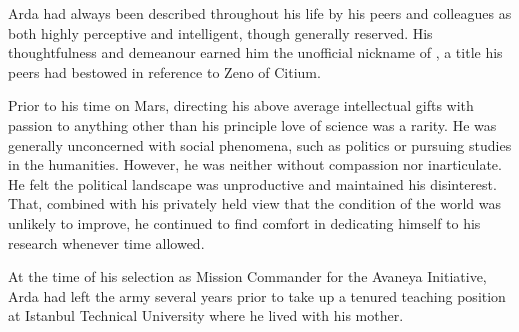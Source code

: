 Arda had always been described throughout his life by his peers and colleagues as both highly perceptive and intelligent, though generally reserved. His thoughtfulness and demeanour earned him the unofficial nickname of , a title his peers had bestowed in reference to Zeno of Citium.

Prior to his time on Mars, directing his above average intellectual gifts with passion to anything other than his principle love of science was a rarity. He was generally unconcerned with social phenomena, such as politics or pursuing studies in the humanities. However, he was neither without compassion nor inarticulate. He felt the political landscape was unproductive and maintained his disinterest. That, combined with his privately held view that the condition of the world was unlikely to improve, he continued to find comfort in dedicating himself to his research whenever time allowed.

At the time of his selection as Mission Commander for the Avaneya Initiative, Arda had left the army several years prior to take up a tenured teaching position at Istanbul Technical University where he lived with his mother.

